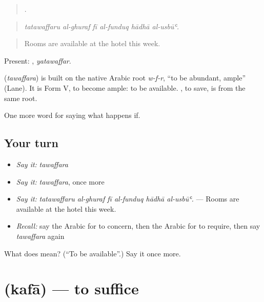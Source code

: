 \begin{quote}
     .
\end{quote}

\begin{quote}
\emph{tatawaffaru al-ghuraf fī al-funduq hādhā al-usbūʿ.}
\end{quote}

\begin{quote}
Rooms are available at the hotel this week.
\end{quote}

Present: , \emph{yatawaffar}.

\begin{cousinweb}
\textbf{} (\emph{tawaffara}) is built on the native Arabic root \emph{w-f-r}, \textquotedblleft{}to be abundant, ample\textquotedblright{} (Lane). It is Form V, to become ample: to be available. , to save, is from the same root.
\end{cousinweb}

\begin{grammarlens}[title={What you've built}]
One more word for saying what happens if.
\end{grammarlens}

\subsection*{Your turn}
\begin{itemize}
\raggedright
  \item \emph{Say it:} \emph{tawaffara}
  \item \emph{Say it:} \emph{tawaffara}, once more
  \item \emph{Say it:} \emph{tatawaffaru al-ghuraf fī al-funduq hādhā al-usbūʿ.} — Rooms are available at the hotel this week.
  \item \emph{Recall:} say the Arabic for to concern, then the Arabic for to require, then say \emph{tawaffara} again
\end{itemize}

\begin{tcolorbox}[breakable,colback=teal!4,colframe=teal!35!black,title={Before you move on}]
What does  mean? (\textquotedblleft{}To be available\textquotedblright{}.) Say it once more.
\end{tcolorbox}
\section[\texorpdfstring{\ar{كفى} (kafā)}{كفى (kafā)}]{ (kafā) — to suffice}

